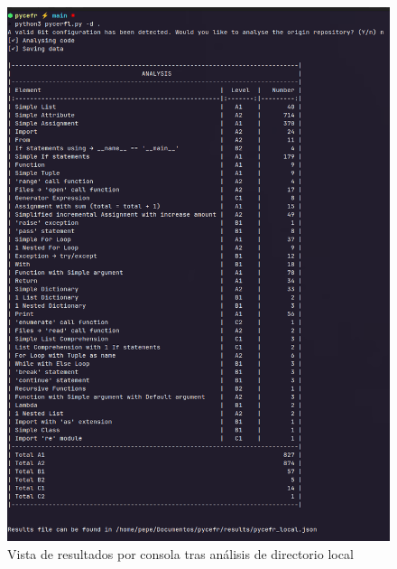 \documentclass[a4paper, 12pt]{book}
\begin{document}
\begin{figure}[H]
  \centering
  \includegraphics[width=\linewidth, keepaspectratio]{img/execution_local.png}
  \caption{Vista de resultados por consola tras análisis de directorio local}
  \label{fig:execution_local}
\end{figure}
\end{document}
